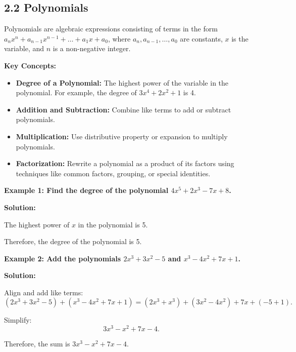 
\subsection*{2.2 Polynomials}
Polynomials are algebraic expressions consisting of terms in the form $a_nx^n + a_{n-1}x^{n-1} + \dots + a_1x + a_0$, where $a_n, a_{n-1}, \dots, a_0$ are constants, $x$ is the variable, and $n$ is a non-negative integer.

\textbf{Key Concepts:}
\begin{itemize}
    \item \textbf{Degree of a Polynomial:} The highest power of the variable in the polynomial. For example, the degree of $3x^4 + 2x^2 + 1$ is 4.
    \item \textbf{Addition and Subtraction:} Combine like terms to add or subtract polynomials.
    \item \textbf{Multiplication:} Use distributive property or expansion to multiply polynomials.
    \item \textbf{Factorization:} Rewrite a polynomial as a product of its factors using techniques like common factors, grouping, or special identities.
\end{itemize}

\begin{flushleft}
\textbf{Example 1: Find the degree of the polynomial $4x^5 + 2x^3 - 7x + 8$.}

\vspace{0.5cm}
\textbf{Solution:}
\vspace{0.5cm}

The highest power of $x$ in the polynomial is 5. 

Therefore, the degree of the polynomial is 5.
\end{flushleft}

\begin{flushleft}
\textbf{Example 2: Add the polynomials $2x^3 + 3x^2 - 5$ and $x^3 - 4x^2 + 7x + 1$.}

\vspace{0.5cm}
\textbf{Solution:}
\vspace{0.5cm}

Align and add like terms:
\[
(2x^3 + 3x^2 - 5) + (x^3 - 4x^2 + 7x + 1) = (2x^3 + x^3) + (3x^2 - 4x^2) + 7x + (-5 + 1).
\]

Simplify:
\[
3x^3 - x^2 + 7x - 4.
\]

Therefore, the sum is $3x^3 - x^2 + 7x - 4$.
\end{flushleft}

